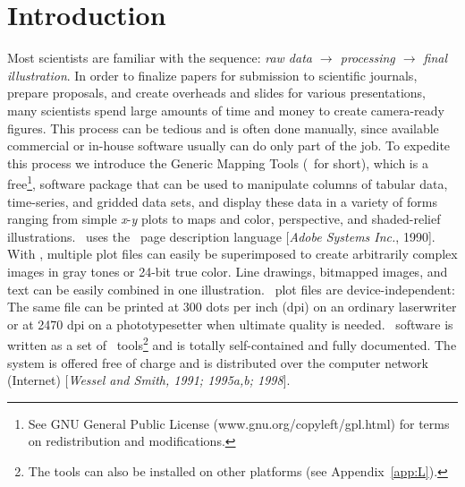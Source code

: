 %
%
\chapter{Introduction}
\label{ch:2}
\thispagestyle{headings}

Most scientists are familiar with the sequence:
{\it raw data $\rightarrow$ processing $\rightarrow$ final illustration}.
In order to finalize papers for submission to scientific journals,
prepare proposals, and create overheads and slides for various
presentations, many scientists spend large amounts of time and
money to create camera-ready figures.  This process can be tedious
and is often done manually, since available commercial or in-house
software usually can do only part of the job.  To expedite this
process we introduce the Generic Mapping Tools (\GMT\ for short),
which is a free\footnote{See GNU General Public License
(www.gnu.org/copyleft/gpl.html) for terms on
redistribution and modifications.}, software package that can be used
to manipulate columns of tabular data, time-series, and gridded
data sets, and display these data in a variety of forms ranging
from simple {\it x}-{\it y} plots to maps and color, perspective,
and shaded-relief illustrations.  \GMT\ uses the \PS\
page description language [{\it Adobe Systems Inc.}, 1990].  With \PS, multiple plot
files can easily be superimposed to create arbitrarily complex
images in gray tones or 24-bit true color.  Line drawings, bitmapped
images, and text can be easily combined in one illustration.
\PS\ plot files are device-independent: The same file
can be printed at 300 dots per inch (dpi) on an ordinary laserwriter
or at 2470 dpi on a phototypesetter when ultimate quality is needed.
\GMT\ software is written as a set of \UNIX\ tools\footnote{The
tools can also be installed on other platforms (see Appendix~\ref{app:L}).}
and is totally self-contained and fully documented.  The system is offered free
of charge and is distributed over the computer
network (Internet) [{\it Wessel and Smith, 1991; 1995a,b; 1998}].

